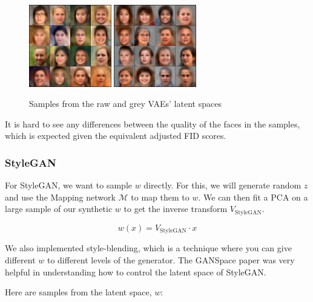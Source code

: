 \documentclass{article}
\begin{document}
\begin{figure}[H]
    \centering
    \includegraphics[width=0.32\textwidth]{images/sample_vae_raw.png}
    \includegraphics[width=0.32\textwidth]{images/sample_vae_grey.png}
    \caption{Samples from the raw and grey VAEs' latent spaces}
\end{figure}

It is hard to see any differences between the quality of the faces in the samples, which is expected given the equivalent adjusted FID scores.

\subsubsection*{StyleGAN}

For StyleGAN, we want to sample $w$ directly. For this, we will generate random $z$ and use the Mapping network $\mathcal{M}$ to map them to $w$.
We can then fit a PCA on a large sample of our synthetic $w$ to get the inverse transform $V_{\text{StyleGAN}}$.

\[w(x) = V_{\text{StyleGAN}} \cdot x\]

We also implemented style-blending, which is a technique where you can give different $w$ to different levels of the generator.
The GANSpace paper \cite{harkonen2020ganspace} was very helpful in understanding how to control the latent space of StyleGAN.

Here are samples from the latent space, $w$:
\end{document}
